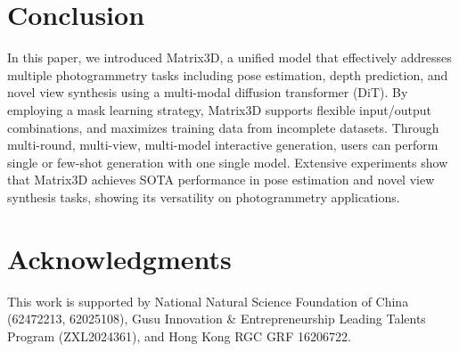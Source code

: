\section{Conclusion}
In this paper, we introduced Matrix3D, a unified model that effectively addresses multiple photogrammetry tasks including pose estimation, depth prediction, and novel view synthesis using a multi-modal diffusion transformer (DiT). By employing a mask learning strategy, Matrix3D supports flexible input/output combinations, and maximizes training data from incomplete datasets. Through multi-round, multi-view, multi-model interactive generation, users can perform single or few-shot generation with one single model. Extensive experiments show that Matrix3D achieves SOTA performance in pose estimation and novel view synthesis tasks, showing its versatility on photogrammetry applications. 

\section{Acknowledgments}
This work is supported by National Natural Science Foundation of China (62472213, 62025108), Gusu Innovation \& Entrepreneurship Leading Talents Program (ZXL2024361), and Hong Kong RGC GRF 16206722.
